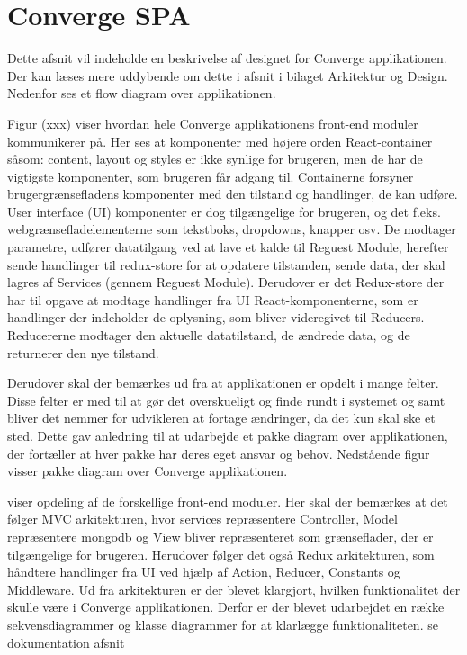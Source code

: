 \section{Converge SPA}

Dette afsnit vil indeholde en beskrivelse af designet for Converge applikationen. Der kan læses mere uddybende om dette i afsnit  i bilaget Arkitektur og Design. Nedenfor ses et flow diagram over applikationen. 


Figur (xxx) viser hvordan hele Converge applikationens front-end moduler kommunikerer på. Her ses at komponenter med højere orden React-container såsom: content, layout og styles er ikke synlige for brugeren, men de har de vigtigste komponenter, som brugeren får adgang til. Containerne forsyner brugergrænsefladens komponenter med den tilstand og handlinger, de kan udføre. 
User interface (UI) komponenter er dog tilgængelige for brugeren, og det f.eks. webgrænsefladelementerne som tekstboks, dropdowns, knapper osv. De modtager parametre, udfører datatilgang ved at lave et kalde til Reguest Module, herefter sende handlinger til redux-store for at opdatere tilstanden, sende data, der skal lagres af Services (gennem Reguest Module). 
Derudover er det Redux-store der har til opgave at modtage handlinger fra UI React-komponenterne, som er handlinger der indeholder de oplysning, som bliver videregivet til Reducers. Reducererne modtager den aktuelle datatilstand, de ændrede data, og de returnerer den nye tilstand. 

Derudover skal der bemærkes ud fra  at applikationen er opdelt i mange felter. Disse felter er med til at gør det overskueligt og finde rundt i systemet og samt bliver det nemmer for udvikleren at fortage ændringer, da det kun skal ske et sted. Dette gav anledning til at udarbejde et pakke diagram over applikationen, der fortæller at hver pakke har deres eget ansvar og behov. Nedstående figur visser pakke diagram over Converge applikationen. 


 viser opdeling af de forskellige front-end moduler. Her skal der bemærkes at det følger MVC arkitekturen, hvor services repræsentere Controller, Model repræsentere mongodb og View bliver repræsenteret som grænseflader, der er tilgængelige for brugeren. Herudover følger det også Redux arkitekturen, som håndtere handlinger fra UI ved hjælp af Action, Reducer, Constants og Middleware.    
Ud fra arkitekturen er der blevet klargjort, hvilken funktionalitet der skulle være i Converge applikationen. Derfor er der blevet udarbejdet en række sekvensdiagrammer og klasse diagrammer for at klarlægge funktionaliteten. se dokumentation afsnit   